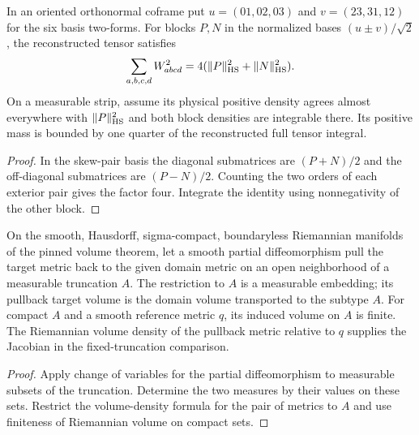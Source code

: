 \begin{lemma}
\label{lem:frame-energy-accounting}
\leanok
In an oriented orthonormal coframe put $u=(01,02,03)$ and
$v=(23,31,12)$ for the six basis two-forms. For blocks $P,N$ in the
normalized bases $(u\pm v)/\sqrt2$, the reconstructed tensor satisfies
\[
 \sum_{a,b,c,d}W_{abcd}^2=4(\|P\|_{\rm HS}^2+\|N\|_{\rm HS}^2).
\]
On a measurable strip, assume its physical positive density agrees
almost everywhere with $\|P\|_{\rm HS}^2$ and both block densities
are integrable there. Its positive mass is bounded by one quarter
of the reconstructed full tensor integral.
\end{lemma}
\begin{proof}
\leanok
In the skew-pair basis the diagonal submatrices are $(P+N)/2$
and the off-diagonal submatrices are $(P-N)/2$. Counting the
two orders of each exterior pair gives the factor four. Integrate
the identity using nonnegativity of the other block.
\end{proof}

\begin{lemma}
\label{lem:volume-on-truncation}
\leanok
On the smooth, Hausdorff, sigma-compact, boundaryless Riemannian
manifolds of the pinned volume theorem, let a smooth partial
diffeomorphism pull the target metric back to the given domain
metric on an open neighborhood of a measurable truncation $A$.
The restriction to $A$ is a measurable embedding; its pullback
target volume is the domain volume transported to the subtype $A$.
For compact $A$ and a smooth reference metric $q$, its induced volume
on $A$ is finite. The Riemannian volume density of the pullback metric
relative to $q$ supplies the Jacobian in the fixed-truncation comparison.
\end{lemma}
\begin{proof}
\leanok
Apply change of variables for the partial diffeomorphism to measurable
subsets of the truncation. Determine the two measures by their values
on these sets. Restrict the volume-density formula for the pair of
metrics to $A$ and use finiteness of Riemannian volume on compact sets.
\end{proof}

